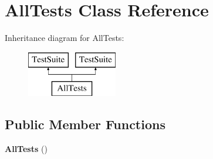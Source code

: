\hypertarget{class_all_tests}{\section{All\-Tests Class Reference}
\label{class_all_tests}
}
Inheritance diagram for All\-Tests\-:\begin{figure}[H]
\begin{center}
\leavevmode
\includegraphics[height=2.000000cm]{class_all_tests}
\end{center}
\end{figure}
\subsection*{Public Member Functions}
\begin{DoxyCompactItemize}
\item 
\hypertarget{class_all_tests_a9edbc8177dd0d4ab2318a2785eeb6953}{{\bfseries All\-Tests} ()}\label{class_all_tests_a9edbc8177dd0d4ab2318a2785eeb6953}

\end{DoxyCompactItemize}
